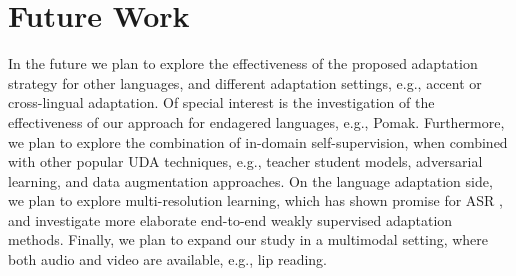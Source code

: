 \documentclass[journal]{IEEEtran}
\begin{document}
\section{Future Work}

In the future we plan to explore the effectiveness of the proposed adaptation strategy for other languages, and different adaptation settings, e.g., accent or cross-lingual adaptation. Of special interest is the investigation of the effectiveness of our approach for endagered languages, e.g., Pomak. Furthermore, we plan to explore the combination of in-domain self-supervision, when combined with other popular UDA techniques, e.g., teacher student models, adversarial learning, and data augmentation approaches. On the language adaptation side, we plan to explore multi-resolution learning, which has shown promise for ASR \cite{paraskevopoulos2020multimodal}, and investigate more elaborate end-to-end weakly supervised adaptation methods. Finally, we plan to expand our study in a multimodal setting, where both audio and video are available, e.g., lip reading.




\small


\end{document}
